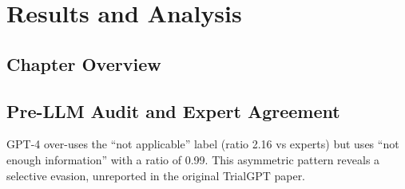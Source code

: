 %

\chapter{Results and Analysis}
\label{chap:results}

\section{Chapter Overview}
\label{sec:res-overview}


\section{Pre-LLM Audit and Expert Agreement}
\label{sec:res-audit}


\begin{finding}
    GPT-4 over-uses the ``not applicable'' label (ratio 2.16 vs experts) but
    uses ``not enough information'' with a ratio of 0.99. This asymmetric
    pattern reveals a selective evasion, unreported in the original
    TrialGPT paper.
\end{finding}

